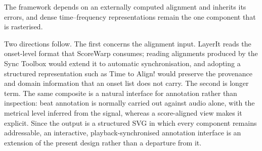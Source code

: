 \documentclass{article}
\begin{document}
The framework depends on an externally computed alignment and inherits its errors, and dense time--frequency representations remain the one component that is rasterised.

Two directions follow. The first concerns the alignment input. LayerIt reads the onset-level format that ScoreWarp consumes; reading alignments produced by the Sync Toolbox \cite{muller2021SyncToolboxPython} would extend it to automatic synchronisation, and adopting a structured representation such as Time to Align! \cite{hentschel2026TimeAlignModelling} would preserve the provenance and domain information that an onset list does not carry. The second is longer term. The same composite is a natural interface for annotation rather than inspection: beat annotation is normally carried out against audio alone, with the metrical level inferred from the signal, whereas a score-aligned view makes it explicit. Since the output is a structured SVG in which every component remains addressable, an interactive, playback-synchronised annotation interface is an extension of the present design rather than a departure from it.





\end{document}
